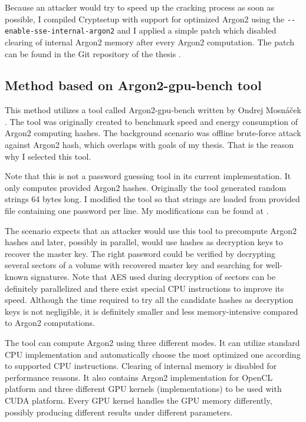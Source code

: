 \documentclass[nolof]{fithesis3}
\begin{document}
Because an attacker would try to speed up the cracking process as soon as possible, I compiled Cryptsetup with support for optimized Argon2 using the \verb+--enable-sse-internal-argon2+ and I applied a simple patch which disabled clearing of internal Argon2 memory after every Argon2 computation. The patch can be found in the Git repository of the thesis \parencite{thesisrepo}.

\subsection{Method based on Argon2-gpu-bench tool}
This method utilizes a tool called Argon2-gpu-bench written by Ondrej Mosnáček \parencite{argon2gpu}. The tool was originally created to benchmark speed and energy consumption of Argon2 computing hashes. The background scenario was offline brute-force attack against Argon2 hash, which overlaps with goals of my thesis. That is the reason why I selected this tool.

Note that this is not a password guessing tool in its current implementation. It only computes provided Argon2 hashes. Originally the tool generated random strings 64 bytes long. I modified the tool so that strings are loaded from provided file containing one password per line. My modifications can be found at \parencite{argon2gpuvojta}.

The scenario expects that an attacker would use this tool to precompute Argon2 hashes and later, possibly in parallel, would use hashes as decryption keys to recover the master key. The right password could be verified by decrypting several sectors of a volume with recovered master key and searching for well-known signatures. Note that AES used during decryption of sectors can be definitely parallelized and there exist special CPU instructions to improve its speed. Although the time required to try all the candidate hashes as decryption keys is not negligible, it is definitely smaller and less memory-intensive compared to Argon2 computations.

The tool can compute Argon2 using three different modes. It can utilize standard CPU implementation and automatically choose the most optimized one according to supported CPU instructions. Clearing of internal memory is disabled for performance reasons. It also contains Argon2 implementation for OpenCL platform and three different GPU kernels (implementations) to be used with CUDA platform. Every GPU kernel handles the GPU memory differently, possibly producing different results under different parameters.
\end{document}
